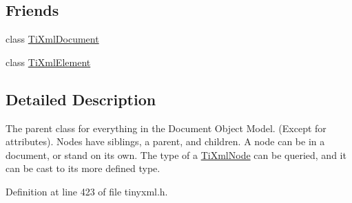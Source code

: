 \subsection*{Friends}
\begin{DoxyCompactItemize}
\item 
class \hyperlink{classTiXmlNode_a173617f6dfe902cf484ce5552b950475}{TiXmlDocument}
\item 
class \hyperlink{classTiXmlNode_ab6592e32cb9132be517cc12a70564c4b}{TiXmlElement}
\end{DoxyCompactItemize}


\subsection{Detailed Description}
The parent class for everything in the Document Object Model. (Except for attributes). Nodes have siblings, a parent, and children. A node can be in a document, or stand on its own. The type of a \hyperlink{classTiXmlNode}{TiXmlNode} can be queried, and it can be cast to its more defined type. 

Definition at line 423 of file tinyxml.h.



